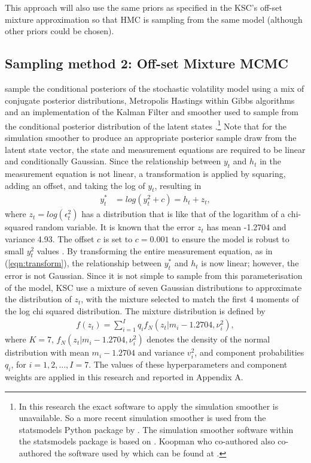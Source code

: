\documentclass[12pt, a4paper]{article}
\begin{document}
        This approach will also use the same priors as specified in the KSC's off-set mixture approximation so that HMC is sampling from the same model (although other priors could be chosen). 

    
    \subsection{Sampling method 2: Off-set Mixture MCMC}
        \citet{kim1998stochastic} sample the conditional posteriors of the stochastic volatility model using a mix of conjugate posterior distributions, Metropolis Hastings \citep{metropolis1953equation, hastings1970monte} within Gibbs \citep{geman1984stochastic} algorithms and an implementation of the Kalman Filter \citep{kalman1960new} and smoother used to sample from the conditional posterior distribution of the latent states \citep{dejong1995}.\footnote{In this research the exact software to apply the simulation smoother is unavailable. So a more recent simulation smoother is used from the statsmodels Python package by \citet{seabold2010statsmodels}. The simulation smoother software within the statsmodels package is based on \citet{durbin2012time}. Koopman who co-authored \citet{durbin2012time} also co-authored the software used by \citet{kim1998stochastic} which can be found at \citet{koopman1996ssfpack}.} Note that for the simulation smoother to produce an appropriate posterior sample draw from the latent state vector, the state and measurement equations are required to be linear and conditionally Gaussian. Since the relationship between $y_t$ and $h_t$ in the measurement equation is not linear, a transformation is applied by squaring, adding an offset, and taking the log of $y_t$, resulting in
        \begin{align}
        y_t^{*} &= log(y_t^2 + c) = h_t + z_t, \label{eqn:transform}
        \end{align}
        where $z_t = log(\epsilon_t^2)$ has a distribution that is like that of the logarithm of a chi-squared random variable. It is known that the error $z_t$ has mean -1.2704 and variance 4.93. The offset $c$ is set to $c=0.001$ to ensure the model is robust to small $y_t^2$ values \citep{fuller1996introduction}. By transforming the entire measurement equation, as in (\ref{eqn:transform}), the relationship between $y_t^{*}$ and $h_t$ is now linear; however, the error is not Gaussian. Since it is not simple to sample from this parameterisation of the model, KSC use a mixture of seven Gaussian distributions to approximate the distribution of $z_t$, with the mixture selected to match the first 4 moments of the log chi squared distribution. The mixture distribution is defined by
        \begin{align}
        f(z_t) = \sum_{i=1}^{I} q_if_N(z_t|m_i-1.2704, \nu_i^2),
        \end{align}
        where $K=7$, $f_N(z_t|m_i-1.2704, \nu_i^2)$ denotes the density of the normal distribution with mean $m_i-1.2704$ and variance $v_i^2$, and  component probabilities $q_i$, for $i=1,2,\ldots, I=7$.  The values of these hyperparameters and component weights are applied in this research and reported in Appendix A.
\end{document}
